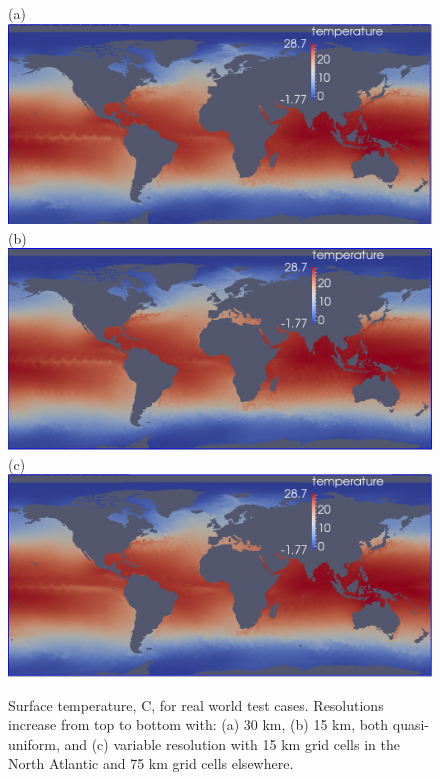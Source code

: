 \begin{figure}[H]
	\centering
(a)\includegraphics[scale=0.36]{ocean/figures/m72s_30km_yr11_k1_T.png}\\
(b)\includegraphics[scale=0.36]{ocean/figures/m72r_15km_yr2_k1_T.png}\\
(c)\includegraphics[scale=0.36]{ocean/figures/m72t_NA_15km_yr11_k1_T.png}
\caption{Surface temperature, C, for real world test cases.  Resolutions increase from top to bottom with: (a) 30 km, (b) 15 km, both quasi-uniform, and (c) variable resolution with 15 km grid cells in the North Atlantic and 75 km grid cells elsewhere. }
	\label{fig:real_world_T2}
\end{figure}

